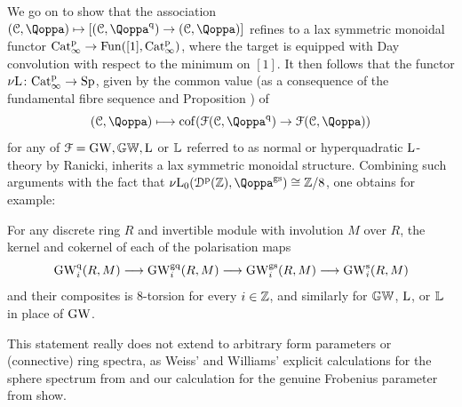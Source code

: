 We go on to show that the association $(\C,\QF) \mapsto [(\C,\QF^\qdr) \to (\C,\QF)]$ refines to a lax symmetric monoidal functor $\mathrm{Cat}^{\mathrm p}_\infty \to \operatorname{Fun}([1],\mathrm{Cat}^{\mathrm p}_\infty)$, where the target is equipped with Day convolution with respect to the minimum on $[1]$.
It then follows that the functor ${\nu\!\operatorname L} \colon \mathrm{Cat}^{\mathrm p}_\infty \rightarrow \mathrm{Sp}$, given by the common value (as a consequence of the fundamental fibre sequence and Proposition ) of 
\[
(\C,\QF) \longmapsto \cof(\F(\C,\QF^\qdr) \rightarrow \F(\C,\QF))
\]
for any of $\mathcal{F} = \operatorname{GW}, \mathbb{GW}, \operatorname L$ or $\mathbb{L}$ referred to as normal or hyperquadratic $\operatorname L$-theory by Ranicki, inherits a lax symmetric monoidal structure. Combining such arguments with the fact that $\NL_0(\Dperf(\mathbb Z),\QF^\mathrm{gs}) \cong \mathbb Z/8$, one obtains for example:

\begin{corollaryintrofour}
\label{corollary:intro-H}%
For any discrete ring $R$ and invertible module with involution $M$ over $R$, the kernel and cokernel of each of the polarisation maps
\[
\operatorname{GW}_i^{\mathrm{q}}(R,M) \longrightarrow \operatorname{GW}_i^\mathrm{gq}(R,M) \longrightarrow \operatorname{GW}_i^\mathrm{gs}(R,M) \longrightarrow \operatorname{GW}_i^\mathrm{s}(R,M)
\]
 and their composites is $8$-torsion for every $i \in \mathbb{Z}$, and similarly for $\mathbb{GW}$, $\operatorname L$, or $\mathbb{L}$ in place of $\operatorname{GW}$.
\end{corollaryintrofour}

This statement really does not extend to arbitrary form parameters or (connective) ring spectra, as Weiss' and Williams' explicit calculations for the sphere spectrum from \cite{WWIII} and our calculation for the genuine Frobenius parameter from \paperthree show.

